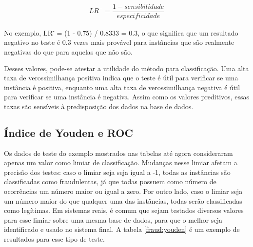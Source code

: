 \vspace{2mm}
\begin{equation}
    LR^{-}=\frac{1 - sensibilidade}{especificidade}
\end{equation}
\vspace{2mm}

No exemplo, LR\textsuperscript{-} = (1 - 0.75) / 0.8333 = 0.3, o que significa que um resultado negativo no teste é 0.3 vezes mais provável para instâncias que são realmente negativas do que para aquelas que não são.

Desses valores, pode-se atestar a utilidade do método para classificação. Uma alta taxa de verossimilhança positiva indica que o teste é útil para verificar se uma instância é positiva, enquanto uma alta taxa de verossimilhança negativa é útil para verificar se uma instância é negativa. Assim como os valores preditivos, essas taxas são sensíveis à predisposição dos dados na base de dados.

\subsection{Índice de Youden e ROC}

Os dados de teste do exemplo mostrados nas tabelas até agora consideraram apenas um valor como limiar de classificação. Mudanças nesse limiar afetam a precisão dos testes: caso o limiar seja seja igual a -1, todas as instâncias são classificadas como fraudulentas, já que todas possuem como número de ocorrências um número maior ou igual a zero. Por outro lado, caso o limiar seja um número maior do que qualquer uma das instâncias, todas serão classificadas como legítimas. Em sistemas reais, é comum que sejam testados diversos valores para esse limiar sobre uma mesma base de dados, para que o melhor seja identificado e usado no sistema final. A tabela \ref{fraud:youden} é um exemplo de resultados para esse tipo de teste.

